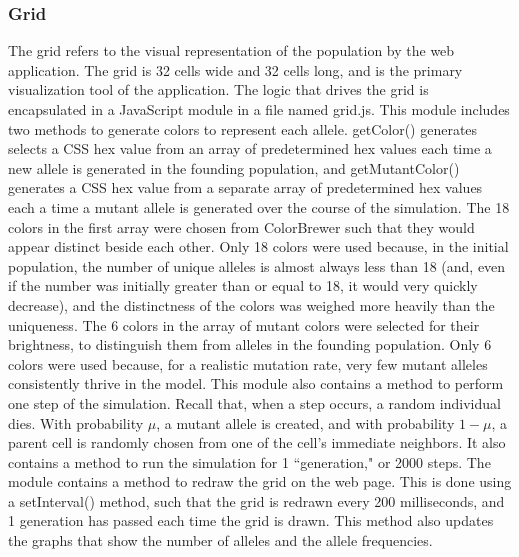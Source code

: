 \documentclass[12pt]{article}
\begin{document}
\begin{spacing}{1.6}
\subsubsection{Grid}
The grid refers to the visual representation of the population by the web application. The grid is 32 cells wide and 32 cells long, and is the primary visualization tool of the application. The logic that drives the grid is encapsulated in a JavaScript module in a file named grid.js.\newline
\newline
This module includes two methods to generate colors to represent each allele. getColor() generates selects a CSS hex value from an array of predetermined hex values each time a new allele is generated in the founding population, and getMutantColor() generates a CSS hex value from a separate array of predetermined hex values each a time a mutant allele is generated over the course of the simulation. The 18 colors in the first array were chosen from ColorBrewer such that they would appear distinct beside each other. Only 18 colors were used because, in the initial population, the number of unique alleles is almost always less than 18 (and, even if the number was initially greater than or equal to 18, it would very quickly decrease), and the distinctness of the colors was weighed more heavily than the uniqueness. The 6 colors in the array of mutant colors were selected for their brightness, to distinguish them from alleles in the founding population. Only 6 colors were used because, for a realistic mutation rate, very few mutant alleles consistently thrive in the model.\newline
\newline
This module also contains a method to perform one step of the simulation. Recall that, when a step occurs, a random individual dies. With probability $\mu$, a mutant allele is created, and with probability $1 - \mu$, a parent cell is randomly chosen from one of the cell's immediate neighbors. It also contains a method to run the simulation for 1 ``generation," or 2000 steps.\newline
\newline
The module contains a method to redraw the grid on the web page. This is done using a setInterval() method, such that the grid is redrawn every 200 milliseconds, and 1 generation has passed each time the grid is drawn. This method also updates the graphs that show the number of alleles and the allele frequencies.\newline
\newline

\end{spacing}
\end{document}

